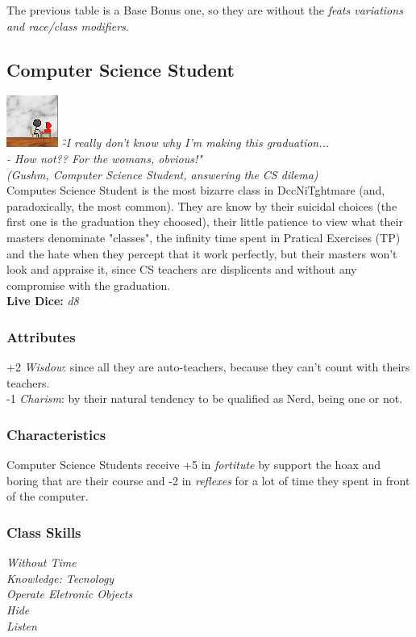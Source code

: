 \documentclass[ letterpaper,12pt]{article}
\begin{document}
The previous table is a Base Bonus one, so they are without the {\it feats variations and race/class modifiers}.\\

\subsection{Computer Science Student}
\includegraphics{../data/classes/Img/dcc.png}
{\it 
\"-I really don't know why I'm making this graduation...\\
- How not?? For the womans, obvious!"\\
(Gushm, Computer Science Student, answering the CS dilema)}\\

Computes Science Student is the most bizarre class in DccNiTghtmare (and,
paradoxically, the most common). They are know by their suicidal choices (the
first one is the graduation they choosed), their little patience to view what
their masters denominate "classes", the infinity time spent in Pratical
Exercises (TP) and the hate when they percept that it work perfectly, but their
masters won't look and appraise it, since CS teachers are displicents and
without any compromise with the graduation.\\

{\bf Live Dice:} {\it d8}

\subsubsection{Attributes}
+2 {\it Wisdow}: since all they are auto-teachers, because they can't count with theirs teachers.\\
-1 {\it Charism}: by their natural tendency to be qualified as Nerd, being one or not.

\subsubsection{Characteristics}
Computer Science Students receive +5 in {\it fortitute} by support the hoax and boring that are their course and -2 in {\it reflexes} for a lot of time they spent in front of the computer.

\subsubsection{Class Skills}
{\it
Without Time\\
Knowledge: Tecnology\\
Operate Eletronic Objects\\
Hide\\
Listen\\}
\end{document}
